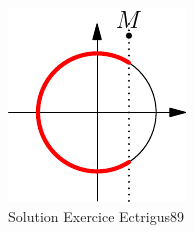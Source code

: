 \begin{figure}[h!]
 \centering
 \includegraphics{Cctrigus89_1.pdf}
 \caption{Solution Exercice Ectrigus89}
 \label{fig:Cctrigus89_1}
\end{figure}

